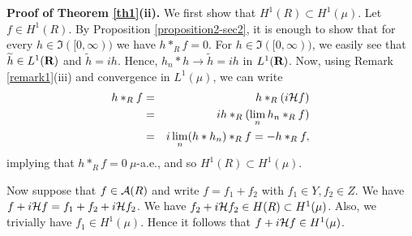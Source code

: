 {\bf Proof of Theorem \ref{th1}(ii).}
We first show that $H^1(R)\subset H^1(\mu)$.
Let $f\in H^1(R)$.  By Proposition \ref{proposition2-sec2},
it is enough to show that for every
$h\in \Im ([0,\infty))$ we have $h*_Rf=0$.
For $h\in \Im([0,\infty))$,
we easily see that $\widetilde{h}\in L^1(\R)$ and
$\widetilde{h}=i h$.  Hence, 
$h_n*h\rightarrow \widetilde{h}=ih$ in $L^1(\R)$.
Now, using Remark \ref{remark1}(iii) and convergence in $L^1(\mu)$, 
we can write
\begin{eqnarray*}
h*_R f	&=&	h*_R(i{\cal H} f)\\
	&=& 	i h*_R (\lim_n h_n*_R f)\\
	&=&	i \lim_n(h*h_n)*_R f=-h*_Rf,
\end{eqnarray*}
implying that $h*_Rf=0\ \mu$-a.e., and 
so $H^1(R)\subset H^1(\mu)$.

Now suppose that $f\in {\cal A}(R)$ and write $f=f_1+f_2$ with
$f_1\in Y, f_2\in Z$.  We have
$f+i{\cal H} f=f_1 + f_2+i {\cal H} f_2$.
We have $f_2+ i{\cal H} f_2\in H(R)\subset H^1(\mu)$.
Also, we trivially have
$f_1\in H^1(\mu)$.  Hence it follows that
$f+i{\cal H} f\in H^1(\mu)$.

